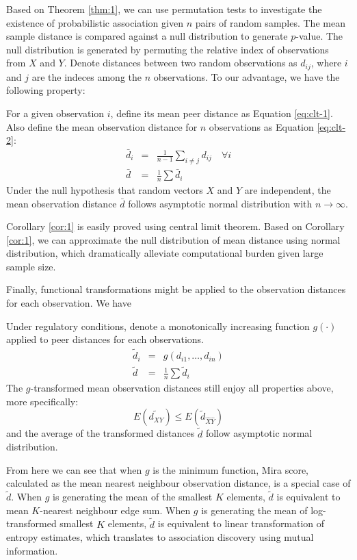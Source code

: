 \documentclass{sig-alternate}
\begin{document}
Based on Theorem \ref{thm:1}, we can use permutation tests to
investigate the existence of probabilistic association given $n$ pairs
of \iid{} random samples. The mean sample distance is compared against
a null distribution to generate $p$-value. The null distribution is
generated by permuting the relative index of observations from $X$ and
$Y$. Denote distances between two random observations as $d_{ij}$,
where $i$ and $j$ are the indeces among the $n$ observations. To our
advantage, we have the following property:
\begin{cor}
  \label{cor:1}
  For a given observation $i$, define its mean peer distance as
  Equation \ref{eq:clt-1}. Also define the mean observation distance
  for $n$ observations as Equation \ref{eq:clt-2}:
  \begin{eqnarray}
    \bar{d}_i &=& \frac{1}{n-1}\sum_{i\ne j} d_{ij} \quad{} \forall i \label{eq:clt-1}\\
    \bar{d} &=& \frac{1}{n}\sum \bar{d}_{i} \label{eq:clt-2}
  \end{eqnarray}
  Under the null hypothesis that random vectors $X$ and $Y$ are
  independent, the mean observation distance $\bar{d}$ follows
  asymptotic normal distribution with $n \to \infty$.
\end{cor}
Corollary \ref{cor:1} is easily proved using central limit theorem.
Based on Corollary \ref{cor:1}, we can approximate the null
distribution of mean distance using normal distribution, which
dramatically alleviate computational burden given large sample size.

Finally, functional transformations might be applied to the
observation distances for each observation. We have
\begin{cor}
  \label{cor:2}
  Under regulatory conditions, denote a monotonically increasing
  function $g(\cdot)$ applied to peer distances for each observations.
  \begin{eqnarray}
    \tilde{d}_i &=& g(d_{i1} ,\ldots, d_{in}) \nonumber \\
    \tilde{d} &=& \frac{1}{n}\sum \tilde{d}_{i} \label{eq:general-equation}
  \end{eqnarray}
  The $g$-transformed mean observation distances still enjoy all
  properties above, more specifically: 
  \begin{displaymath}
    E(\tilde{d_{XY}}) \le E(\tilde{d}_{\hat{X}\hat{Y}})
  \end{displaymath}
  and the average of the transformed distances $\tilde{d}$ follow
  asymptotic normal distribution.
\end{cor}
From here we can see that when $g$ is the minimum function, Mira
score, calculated as the mean nearest neighbour observation distance,
is a special case of $\tilde{d}$. When $g$ is generating the mean of
the smallest $K$ elements, $\tilde{d}$ is equivalent to mean
$K$-nearest neighbour edge sum. When $g$ is generating the mean of
log-transformed smallest $K$ elements, $\tilde{d}$ is equivalent to
linear transformation of entropy estimates, which translates to
association discovery using mutual information. 
\end{document}

